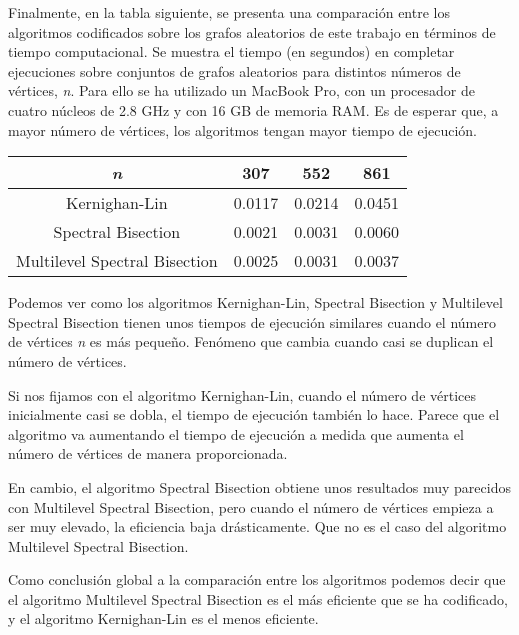 Finalmente, en la tabla siguiente, se presenta una comparación entre los algoritmos codificados sobre los grafos aleatorios de este trabajo en términos de tiempo computacional. Se muestra el tiempo (en segundos) en completar ejecuciones sobre conjuntos de grafos aleatorios para distintos números de vértices, \textit{n}. Para ello se ha utilizado un MacBook Pro, con un procesador de cuatro núcleos de 2.8 GHz y con 16 GB de memoria RAM. Es de esperar que, a mayor número de vértices, los algoritmos tengan mayor tiempo de ejecución.

\begin{center}
	\begin{tabular}{|c|c|c|c|}
		\hline
		\textit{n} & 307 & 552 & 861 \\
		\hline
		Kernighan-Lin & 0.0117 & 0.0214 & 0.0451\\
		\hline
		Spectral Bisection & 0.0021 & 0.0031 & 0.0060 \\
		\hline
		Multilevel Spectral Bisection & 0.0025 & 0.0031 & 0.0037 \\ 
		\hline
	\end{tabular}
\end{center}

Podemos ver como los algoritmos Kernighan-Lin, Spectral Bisection y Multilevel Spectral Bisection tienen unos tiempos de ejecución similares cuando el número de vértices \textit{n} es más pequeño. Fenómeno que cambia cuando casi se duplican el número de vértices.

Si nos fijamos con el algoritmo Kernighan-Lin, cuando el número de vértices inicialmente casi se dobla, el tiempo de ejecución también lo hace. Parece que el algoritmo va aumentando el tiempo de ejecución a medida que aumenta el número de vértices de manera proporcionada.

En cambio, el algoritmo Spectral Bisection obtiene unos resultados muy parecidos con Multilevel Spectral Bisection, pero cuando el número de vértices empieza a ser muy elevado, la eficiencia baja drásticamente. Que no es el caso del algoritmo Multilevel Spectral Bisection.

Como conclusión global a la comparación entre los algoritmos podemos decir que el algoritmo Multilevel Spectral Bisection es el más eficiente que se ha codificado, y el algoritmo Kernighan-Lin es el menos eficiente.